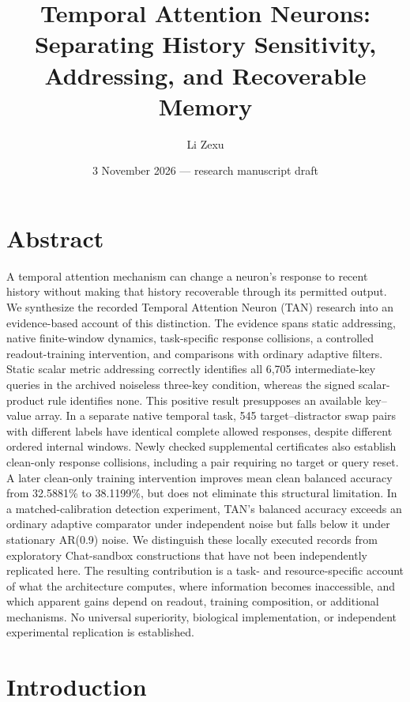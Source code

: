 \documentclass[
  10pt,
]{article}
\title{Temporal Attention Neurons: Separating History Sensitivity,
Addressing, and Recoverable Memory}
\author{Li Zexu}
\date{3 November 2026 --- research manuscript draft}
\begin{document}
\maketitle

\section{Abstract}\label{abstract}

A temporal attention mechanism can change a neuron's response to recent
history without making that history recoverable through its permitted
output. We synthesize the recorded Temporal Attention Neuron (TAN)
research into an evidence-based account of this distinction. The
evidence spans static addressing, native finite-window dynamics,
task-specific response collisions, a controlled readout-training
intervention, and comparisons with ordinary adaptive filters. Static
scalar metric addressing correctly identifies all 6,705 intermediate-key
queries in the archived noiseless three-key condition, whereas the
signed scalar-product rule identifies none. This positive result
presupposes an available key--value array. In a separate native temporal
task, 545 target--distractor swap pairs with different labels have
identical complete allowed responses, despite different ordered internal
windows. Newly checked supplemental certificates also establish
clean-only response collisions, including a pair requiring no target or
query reset. A later clean-only training intervention improves mean
clean balanced accuracy from 32.5881\% to 38.1199\%, but does not
eliminate this structural limitation. In a matched-calibration detection
experiment, TAN's balanced accuracy exceeds an ordinary adaptive
comparator under independent noise but falls below it under stationary
AR(0.9) noise. We distinguish these locally executed records from
exploratory Chat-sandbox constructions that have not been independently
replicated here. The resulting contribution is a task- and
resource-specific account of what the architecture computes, where
information becomes inaccessible, and which apparent gains depend on
readout, training composition, or additional mechanisms. No universal
superiority, biological implementation, or independent experimental
replication is established.

\section{Introduction}\label{introduction}
\end{document}
